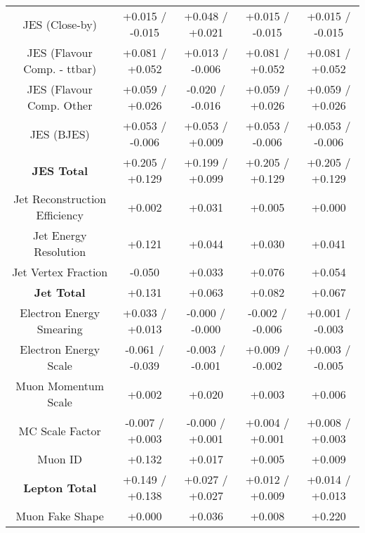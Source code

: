 \begin{table}[htbp]
\begin{center}
\begin{tabular}{|c|c|c|c|c|}
JES (Close-by)                        &+0.015   / -0.015   & +0.048   / +0.021   & +0.015   / -0.015   & +0.015   / -0.015  \\
JES (Flavour Comp. - ttbar)           &+0.081   / +0.052   & +0.013   / -0.006   & +0.081   / +0.052   & +0.081   / +0.052  \\
JES (Flavour Comp. Other              &+0.059   / +0.026   & -0.020   / -0.016   & +0.059   / +0.026   & +0.059   / +0.026  \\
JES (BJES)                            &+0.053   / -0.006   & +0.053   / +0.009   & +0.053   / -0.006   & +0.053   / -0.006  \\
\hline
\textbf{JES Total}                    &+0.205   / +0.129   & +0.199   / +0.099   & +0.205   / +0.129   & +0.205   / +0.129  \\
\hline
Jet Reconstruction Efficiency         &+0.002              & +0.031              & +0.005              & +0.000             \\
Jet Energy Resolution                 &+0.121              & +0.044              & +0.030              & +0.041             \\
Jet Vertex Fraction                   &-0.050              & +0.033              & +0.076              & +0.054             \\
\hline
\textbf{Jet Total}                    &+0.131              & +0.063              & +0.082              & +0.067             \\
\hline
Electron Energy Smearing              &+0.033   / +0.013   & -0.000   / -0.000   & -0.002   / -0.006   & +0.001   / -0.003  \\
Electron Energy Scale                 &-0.061   / -0.039   & -0.003   / -0.001   & +0.009   / -0.002   & +0.003   / -0.005  \\
Muon Momentum Scale                   &+0.002              & +0.020              & +0.003              & +0.006             \\
MC Scale Factor                       &-0.007   / +0.003   & -0.000   / +0.001   & +0.004   / +0.001   & +0.008   / +0.003  \\
Muon ID                               &+0.132              & +0.017              & +0.005              & +0.009             \\
\hline
\textbf{Lepton Total}                 &+0.149   / +0.138   & +0.027   / +0.027   & +0.012   / +0.009   & +0.014   / +0.013  \\
\hline
Muon Fake Shape                       &+0.000              & +0.036              & +0.008              & +0.220             \\

\end{tabular}
\end{center}
\end{table}
